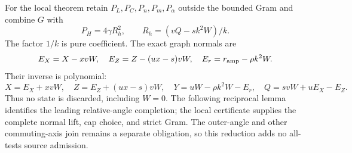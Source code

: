 For the local theorem retain $P_L,P_C,P_n,P_m,P_\alpha$ outside the
bounded Gram and combine $G$ with
\[
 P_H=4\gamma R_h^2,\qquad R_h=(vQ-sk^2W)/k.
 \tag{UR17}
\]
The factor $1/k$ is pure coefficient. The exact graph normals are
\[
 E_X=X-xvW,\quad E_Z=Z-(ux-s)vW,\quad
 E_r=r_{\rm amp}-\rho k^2W.
\]
Their inverse is polynomial:
\[
 X=E_X+xvW,\quad Z=E_Z+(ux-s)vW,\quad
 Y=uW-\rho k^2W-E_r,\quad Q=svW+uE_X-E_Z.
\]
Thus no state is discarded, including $W=0$. The following reciprocal
lemma identifies the leading relative-angle completion; the local
certificate supplies the complete normal lift, cap choice, and strict
Gram. The outer-angle and other commuting-axis join remains a separate
obligation, so this reduction adds no all-tests source admission.
